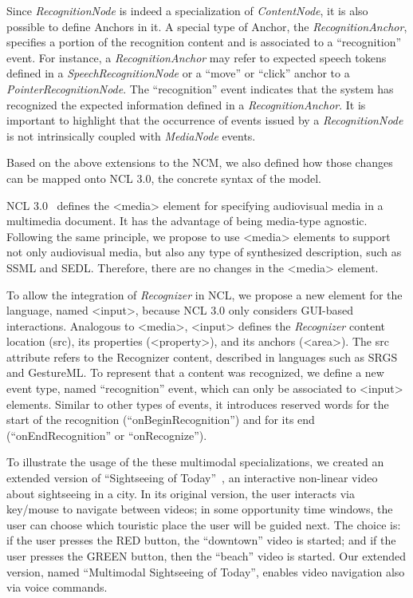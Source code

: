\documentclass[
  doutorado,
  american
]{ThesisPUC}
\begin{document}
Since \textit{RecognitionNode} is indeed a specialization of 
\textit{ContentNode}, it is also 
possible to define Anchors in it. A special type of Anchor, the 
\textit{RecognitionAnchor}, specifies a portion of the recognition content and 
is 
associated to a “recognition” event. For instance, a \textit{RecognitionAnchor} 
may refer to expected speech tokens defined in a \textit{SpeechRecognitionNode} 
or 
a “move” or “click” anchor to a \textit{PointerRecognitionNode}. The 
“recognition” event indicates that the system has recognized the expected 
information defined in a \textit{RecognitionAnchor}. It is important to 
highlight that the occurrence of events issued by a \textit{RecognitionNode} is 
not intrinsically coupled with \textit{MediaNode} events. 

Based on the above extensions to the NCM, we also defined how those changes 
can be mapped onto NCL 3.0, the concrete syntax of the model.

NCL 3.0~\cite{abnt_abnt_2016} defines the <media> element for 
specifying audiovisual media in a 
multimedia document. It has the advantage of being media-type agnostic. 
Following the same principle, we propose to use <media> elements to support not 
only audiovisual media, but also any type of synthesized description, such as 
SSML and SEDL. Therefore, there are no changes in the <media> element.

To allow the integration of \textit{Recognizer} in NCL, we propose a new 
element for the 
language, named <input>, because NCL 3.0 only considers GUI-based interactions. 
Analogous to <media>, <input> defines the \textit{Recognizer} content location 
(src), 
its properties (<property>), and its anchors (<area>). The src attribute refers 
to the Recognizer content, described in languages such as SRGS and GestureML. 
To represent that a content was recognized, we define a new event type, 
named “recognition” event, which can only be associated to <input> elements. 
Similar to other types of events, it introduces reserved words for the start of 
the recognition (“onBeginRecognition”) and for its end (“onEndRecognition” or 
“onRecognize”). 

To illustrate the usage of the these multimodal specializations, we created an 
extended version of “Sightseeing of Today”~\cite{fernando_o_2009}, an 
interactive non-linear video~\cite{meixner_interactive_2012} about sightseeing 
in a city. In its original version, the user interacts 
via key/mouse to navigate between videos; in some opportunity time windows, the 
user can choose which touristic place the user will be guided next. The choice 
is: if the user presses the RED button, the “downtown” video is started; and if 
the user presses the GREEN button, then the “beach” video is started. Our 
extended version, named “Multimodal Sightseeing of Today”, enables video 
navigation also via voice commands.
\end{document}

